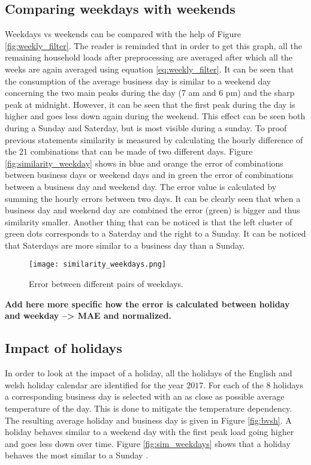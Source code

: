 \subsection{Comparing weekdays with weekends} \label{s:Comparing weekdays with weekends}
Weekdays vs weekends can be compared with the help of Figure \ref{fig:weekly_filter}. The reader is reminded that in order to get this graph, all the remaining household loads after preprocessing are averaged after which all the weeks are again averaged using equation \ref{eq:weekly_filter}. It can be seen that the consumption of the average business day is similar to a weekend day concerning the two main peaks during the day (7 am and 6 pm) and the sharp peak at midnight. However, it can be seen that the first peak during the day is higher and goes less down again during the weekend. This effect can be seen both during a Sunday and Saterday, but is most visible during a sunday. To proof previous statements similarity is measured by calculating the hourly difference of the $ 21 $ combinations that can be made of two different days. Figure \ref{fig:similarity_weekday} shows in blue and orange the error of combinations between business days or weekend days and in green the error of combinations between a business day and weekend day. The error value is calculated by summing the hourly errors between two days. It can be clearly seen that when a business day and weekend day are combined the error (green) is bigger and thus similarity smaller. Another thing that can be noticed is that the left cluster of green dots corresponds to a Saterday and the right to a Sunday. It can be noticed that Saterdays are more similar to a business day than a Sunday. 

\begin{figure}[h!]
	\centering
	\texttt{[image: similarity\_weekdays.png]}
	\caption{Error between different pairs of weekdays.}
	\label{fig:similarity_weekdays}
\end{figure}


\textbf{Add here more specific how the error is calculated between holiday and weekday --> MAE and normalized.}

\subsection{Impact of holidays}\label{s:Impact of holidays}
In order to look at the impact of a holiday, all the holidays of the English and welsh holiday calendar are identified for the year $ 2017 $. For each of the $ 8 $ holidays a corresponding business day is selected with an as close as possible average temperature of the day. This is done to mitigate the temperature dependency. The resulting average holiday and business day is given in Figure \ref{fig:bvsh}. A holiday behaves similar to a weekend day with the first peak load going higher and goes less down over time. Figure \ref{fig:sim_weekdays} shows that a holiday behaves the most similar to a Sunday .

